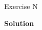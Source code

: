 \documentclass[12pt, a4paper]{article}
\begin{document}
\thispagestyle{fancy}

\begin{exercisebox}{Exercise N}
\end{exercisebox}

\textbf{Solution}

\end{document}

